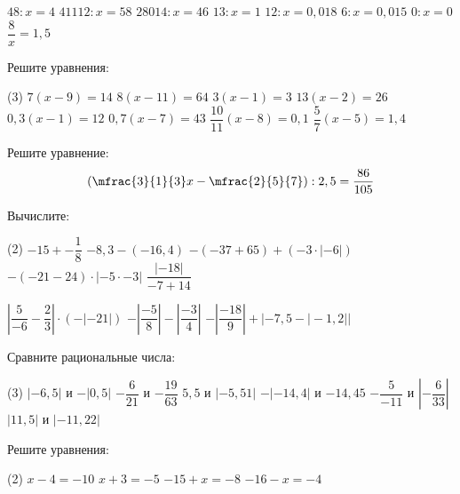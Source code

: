 \begin{class}[number=1-2]
\begin{listofex}[resume]
\begin{tasks}
			
			\task \( 48 : x =4 \)
			\task \( 41112 : x =58 \)
			\task \( 28014 : x = 46 \)
			\task \( 13 : x =1 \)
			\task \( 12 : x = 0,018 \)
			\task \( 6:x = 0,015 \)
			\task \( 0:x = 0 \)
			\task \( \dfrac{8}{x}=1,5 \)
		\end{tasks}
		\item Решите уравнения:
		\begin{tasks}(3) %
			\task \( 7(x-9)=14 \)
			\task \( 8(x-11)=64 \)
			\task \( 3(x-1)=3 \)
			\task \( 13(x-2)=26 \)
			\task \( 0,3(x-1)=12 \)
			\task \( 0,7(x-7)=43 \)
			\task \( \dfrac{10}{11}(x-8)=0,1 \)
			\task \( \dfrac{5}{7}(x-5)=1,4 \)
		\end{tasks}
		\item Решите уравнение: \[ \left( \mfrac{3}{1}{3}x-\mfrac{2}{5}{7} \right):2,5 = \dfrac{86}{105}  \]
	\end{listofex}
\end{class}

\begin{homework}[number=1]
	\begin{listofex}
		\item Вычислите:
		\begin{tasks}(2)
			\task \( -15 + -\dfrac{1}{8} \)
			\task \( -8,3-(-16,4) \)
			\task \( -(-37+65)+(-3 \cdot |-6|) \)
			\task \( -(-21-24) \cdot |-5 \cdot -3| \)
			\task \( \dfrac{|-18|}{-7+14} \)
			
			\task \( \left| \dfrac{5}{-6}-\dfrac{2}{3} \right| \cdot (-|-21|) \)
			\task \(  -\left|\dfrac{-5}{8}\right|-|\dfrac{-3}{4}| \)
			\task \(  -\left| \dfrac{-18}{9} \right| + |-7,5-|-1,2|| \)
			
		\end{tasks}
		\item Сравните рациональные числа:
		\begin{tasks}(3)
			\task \( |-6,5| \) и \( -|0,5| \)
			\task \( -\dfrac{6}{21} \) и \( -\dfrac{19}{63} \)
			\task \( 5,5 \) и \( |-5,51| \)
			\task \( -|-14,4| \) и \( -14,45 \)
			\task \( -\dfrac{5}{-11} \) и \( \left| -\dfrac{6}{33} \right| \)
			\task \( |11,5| \) и \( |-11,22| \)
		\end{tasks}
		\item Решите уравнения:
		\begin{tasks}(2)
			\task \( x-4=-10 \)
			\task \( x+3=-5 \)
			\task \( -15+x=-8 \)
			\task \( -16-x=-4 \)
		\end{tasks}
	\end{listofex}
\end{homework}

